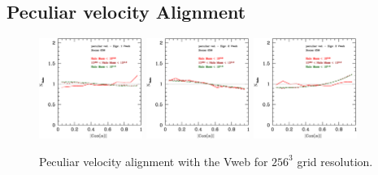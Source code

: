 \documentclass[usenatbib]{mn2e}
\begin{document}
\subsection{Peculiar velocity Alignment}

\begin{figure}
\includegraphics[width=0.30\textwidth]{../plot2/Vel/256_vel_V1.ps}
\includegraphics[width=0.30\textwidth]{../plot2/Vel/256_vel_V2.ps}
\includegraphics[width=0.30\textwidth]{../plot2/Vel/256_vel_V3.ps}
\caption{Peculiar velocity alignment with the Vweb for $256^3$ grid resolution.}
\end{figure}
\end{document}

